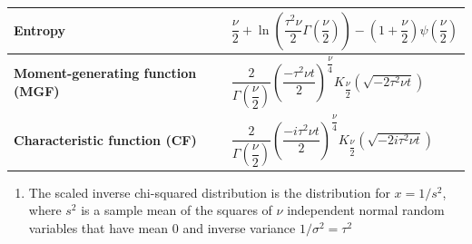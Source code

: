 \begin{customTableWrapper}{2}
\begin{longtable}{|m{6cm}|p{9cm}|}
    \textbf{Entropy} &
    ${\displaystyle {\dfrac {\nu }{2}}\!+\!\ln \left({\dfrac {\tau ^{2}\nu }{2}}\Gamma \left({\dfrac {\nu }{2}}\right)\right)}{\displaystyle \!-\!\left(1\!+\!{\dfrac {\nu }{2}}\right)\psi \left({\dfrac {\nu }{2}}\right)}$
    \\[1ex] \hline

    \textbf{Moment-generating function (MGF)} &
    ${\displaystyle {\dfrac {2}{\Gamma ({\dfrac {\nu }{2}})}}\left({\dfrac {-\tau ^{2}\nu t}{2}}\right)^{\!\!{\dfrac {\nu }{4}}}\!\!K_{\dfrac {\nu }{2}}\left({\sqrt {-2\tau ^{2}\nu t}}\right)}$
    \\[1ex] \hline

    \textbf{Characteristic function (CF)} &
    ${\displaystyle {\dfrac {2}{\Gamma ({\dfrac {\nu }{2}})}}\left({\dfrac {-i\tau ^{2}\nu t}{2}}\right)^{\!\!{\dfrac {\nu }{4}}}\!\!K_{\dfrac {\nu }{2}}\left({\sqrt {-2i\tau ^{2}\nu t}}\right)}$
    \\[1ex] \hline

\end{longtable}
\end{customTableWrapper}

\begin{enumerate}
    \item The scaled inverse chi-squared distribution is the distribution for $x = 1/s^2$, where $s^2$ is a sample mean of the squares of $\nu$ independent normal random variables that have mean $0$ and inverse variance $1/\sigma^2 = \tau^2$

\end{enumerate}























































